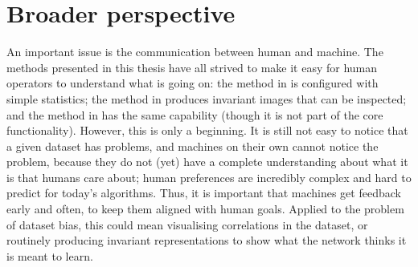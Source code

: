 \section{Broader perspective}\label{sec:broader-perspective}
%
An important issue is the communication between human and machine.
The methods presented in this thesis have all strived to make it easy for human operators to understand what is going on:
the method in  is configured with simple statistics;
the method in  produces invariant images that can be inspected;
and the method in  has the same capability
(though it is not part of the core functionality).
However, this is only a beginning.
It is still not easy to notice that a given dataset has problems,
and machines on their own cannot notice the problem,
because they do not (yet) have a complete understanding about what it is that humans care about;
human preferences are incredibly complex \citep{yudkowsky2011complex} and hard to predict for today's algorithms.
Thus, it is important that machines get feedback early and often,
to keep them aligned with human goals.
Applied to the problem of dataset bias,
this could mean visualising correlations in the dataset,
or routinely producing invariant representations to show what the network thinks it is meant to learn.

